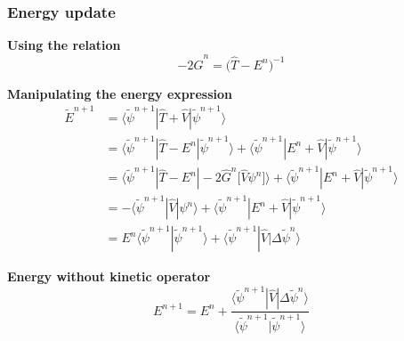 \documentclass[mathserif, 10pt]{beamer}
\begin{document}
\begin{frame}
    \frametitle{Energy update}
    \centering
    \textbf{Using the relation}
    \begin{equation}
        \nonumber
        -2\hat{G}^n = \big(\hat{T} - E^n\big)^{-1}
    \end{equation}

    \vspace{5mm}

    \textbf{Manipulating the energy expression}
    \begin{align}
        \tilde{E}^{n+1}
        \nonumber
        &=	\langle\tilde{\psi}^{n+1}| \hat{T}+\hat{V} | \tilde{\psi}^{n+1}\rangle\\
        \nonumber
        &=	\langle\tilde{\psi}^{n+1}|  \hat{T} - E^n  | \tilde{\psi}^{n+1}\rangle
        +	\langle\tilde{\psi}^{n+1}|  E^n + \hat{V}  | \tilde{\psi}^{n+1}\rangle\\
        \nonumber
        &=	\langle\tilde{\psi}^{n+1}|  \hat{T} - E^n  | 
	        -2\hat{G}^n\big[\hat{V}\psi^n\big]\rangle
        +	\langle\tilde{\psi}^{n+1}| E^n + \hat{V} |\tilde{\psi}^{n+1}\rangle\\
        \nonumber
        &= -\langle\tilde{\psi}^{n+1}| \hat{V} |\psi^{n}\rangle
        +	\langle\tilde{\psi}^{n+1}| E^n + \hat{V} |\tilde{\psi}^{n+1}\rangle\\
        \nonumber
        &= E^{n}\langle\tilde{\psi}^{n+1}|\tilde{\psi}^{n+1}\rangle + 
	    \langle\tilde{\psi}^{n+1}| \hat{V} |\Delta\tilde{\psi}^{n}\rangle
    \end{align}

    \vspace{8mm}

    \centering
    \textbf{Energy without kinetic operator}
    \begin{equation}
        \nonumber
        E^{n+1} = E^{n} + 
        \frac{\langle\tilde{\psi}^{n+1}| \hat{V} |\Delta\tilde{\psi}^{n}\rangle}
        {\langle\tilde{\psi}^{n+1}|\tilde{\psi}^{n+1}\rangle}
    \end{equation}
\end{frame}
\end{document}
